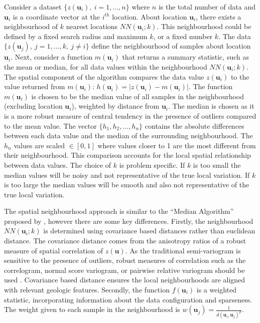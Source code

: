 Consider a dataset $\{z(\mathbf{u}_{i}), \ i = 1, \dots, n\}$ where $n$ is the total number of data and $\mathbf{u}_{i}$ is a coordinate vector at the $i^{th}$ location. About location $\mathbf{u}_{i}$, there exists a neighbourhood of $k$ nearest locations $NN(\mathbf{u}_{i}; k)$. This neighbourhood could be defined by a fixed search radius and maximum $k$, or a fixed number $k$. The data $\{z(\mathbf{u}_{j}), \ j = 1, \dots, k, \ j \neq i \}$ define the neighbourhood of samples about location $\mathbf{u}_{i}$. Next, consider a function $m(\mathbf{u}_{i})$ that returns a summary statistic, such as the mean or median, for all data values within the neighbourhood $NN(\mathbf{u}_{i}; k)$. The spatial component of the algorithm compares the data value $z(\mathbf{u}_{i})$ to the value returned from $m(\mathbf{u}_{i})$: $h(\mathbf{u}_{i}) = |z(\mathbf{u}_{i}) - m(\mathbf{u}_{i})|$. The function $m(\mathbf{u}_{i})$ is chosen to be the median value of all samples in the neighbourhood (excluding location $\mathbf{u}_{i}$), weighted by distance from $\mathbf{u}_{i}$. The median is chosen as it is a more robust measure of central tendency in the presence of outliers compared to the mean value. The vector $\{h_{1}, h_{2}, \dots, h_{n}\}$ contains the absolute differences between each data value and the median of the surrounding neighbourhood. The $h_{n}$ values are scaled $\in [0,1]$ where values closer to 1 are the most different from their neighbourhood. This comparison accounts for the local spatial relationship between data values. The choice of $k$ is problem specific. If $k$ is too small the median values will be noisy and not representative of the true local variation. If $k$ is too large the median values will be smooth and also not representative of the true local variation.

The spatial neighbourhood approach is similar to the ``Median Algorithm'' proposed by \cite{chen2008detecting}, however there are some key differences. Firstly, the neighbourhood $NN(\mathbf{u}_{i}; k)$ is determined using covariance based distances rather than euclidean distance. The covariance distance comes from the anisotropy ratios of a robust measure of spatial correlation of $z(\mathbf{u})$. As the traditional semi-variogram is sensitive to the presence of outliers, robust measures of correlation such as the correlogram, normal score variogram, or pairwise relative variogram should be used \citep{babakhani2014geostatistical,drumond2019using}. Covariance based distance ensures the local neighbourhoods are aligned with relevant geologic features. Secondly, the function $f(\mathbf{u}_{i})$ is a weighted statistic, incorporating information about the data configuration and sparseness. The weight given to each sample in the neighbourhood is $w(\mathbf{u}_{j})=\frac{1}{d(\mathbf{u}_{i},\mathbf{u}_{j})^{p}}$.

